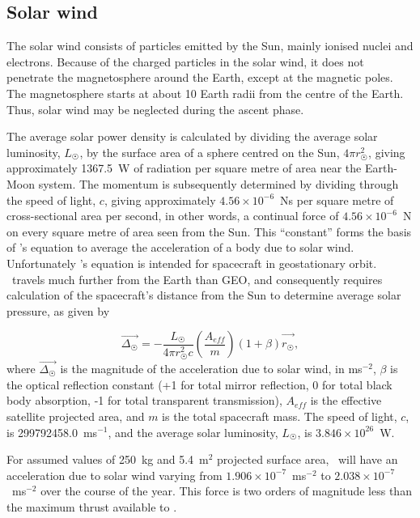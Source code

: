 \subsection{Solar wind} \label{sub:Solar-Wind}

The solar wind consists of particles emitted by the Sun, mainly ionised nuclei and electrons. Because of the charged particles in the solar wind, it does not penetrate the magnetosphere around the Earth, except at the magnetic poles. The magnetosphere starts at about 10 Earth radii from the centre of the Earth. Thus, solar wind may be neglected during the ascent phase.

The average solar power density is calculated by dividing the average solar luminosity, $L_\Sun$,  by the surface area of a sphere centred on the Sun, $4\pi r_\Sun^2$, giving approximately 1367.5~W of radiation per square metre of area near the Earth-Moon system. The momentum is subsequently determined by dividing through the speed of light, $c$, giving approximately $4.56\times10^{-6}$~Ns per square metre of cross-sectional area per second, in other words, a continual force of $4.56\times10^{-6}$~N on every square metre of area seen from the Sun. This \enquote{constant} forms the basis of \textcite[p. 223]{Chobotov2002}'s equation to average the acceleration of a body due to solar wind. Unfortunately \citeauthor{Chobotov2002}'s equation is intended for spacecraft in geostationary orbit. \BW\ travels much further from the Earth than GEO, and consequently requires calculation of the spacecraft's distance from the Sun to determine average solar pressure, as given by

\begin{equation}\label{eq:solar-wind}
\vec{\Delta_\Sun} = -\frac{L_\Sun}{4\pi r_\Sun^2c}\left(\frac{A_{eff}}{m}\right)(1+\beta)\vec{\hat{r_\Sun}},
\end{equation}
where $\vec{\Delta_\Sun}$ is the magnitude of the acceleration due to solar wind, in ms$^{-2}$, $\beta$ is the optical reflection constant (+1 for total mirror reflection, 0 for total black body absorption, -1 for total transparent transmission), $A_{eff}$ is the effective satellite projected area, and $m$ is the total spacecraft mass. The speed of light, $c$, is 299792458.0~ms$^{-1}$, and the average solar luminosity, $L_\Sun$, is $3.846\times10^{26}$~W.

For assumed values of 250~kg and 5.4~m$^2$ projected surface area, \BW\ will have an acceleration due to solar wind varying from $1.906\times10^{-7}$~ms$^{-2}$ to $2.038\times10^{-7}$~ms$^{-2}$ over the course of the year. This force is two orders of magnitude less than the maximum thrust available to \BW.

